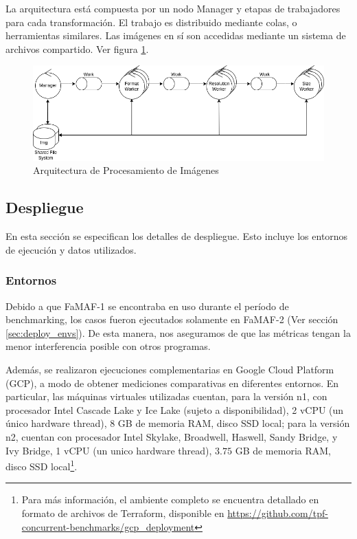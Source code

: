 \documentclass[11pt]{article}
\let\Oldsubsection\subsection
\renewcommand{\subsection}{\FloatBarrier\Oldsubsection}
\let\Oldsubsubsection\subsubsection
\renewcommand{\subsubsection}{\FloatBarrier\Oldsubsubsection}
\begin{document}
La arquitectura está compuesta por un nodo Manager y etapas de trabajadores para cada transformación. El trabajo es distribuido mediante colas, o herramientas similares. Las imágenes en sí son accedidas mediante un sistema de archivos compartido. Ver figura \ref{fig:sis_dist:image_processing_arch}.

\begin{figure}[h]
    \centering
    \includegraphics[scale=0.5]{resources/distributed_systems/image_processing_arch.png}
    \caption{Arquitectura de Procesamiento de Imágenes}
    \label{fig:sis_dist:image_processing_arch}
\end{figure}

\subsection{Despliegue}

En esta sección se especifican los detalles de despliegue. Esto incluye los entornos de ejecución y datos utilizados.

\subsubsection{Entornos}

Debido a que FaMAF-1 se encontraba en uso durante el período de benchmarking, los casos fueron ejecutados solamente en FaMAF-2 (Ver sección \ref{sec:deploy_envs}). De esta manera, nos aseguramos de que las métricas tengan la menor interferencia posible con otros programas.

Además, se realizaron ejecuciones complementarias en Google Cloud Platform (GCP), a modo de obtener mediciones comparativas en diferentes entornos. En particular, las máquinas virtuales utilizadas cuentan, para la versión n1, con procesador Intel Cascade Lake y Ice Lake (sujeto a disponibilidad), 2 vCPU (un único hardware thread), 8 GB de memoria RAM, disco SSD local; para la versión n2, cuentan con procesador Intel Skylake, Broadwell, Haswell, Sandy Bridge, y Ivy Bridge, 1 vCPU (un unico hardware thread), $3.75$ GB de memoria RAM, disco SSD local\footnote{Para más información, el ambiente completo se encuentra detallado en formato de archivos de Terraform, disponible en \url{https://github.com/tpf-concurrent-benchmarks/gcp_deployment}}.
\end{document}
